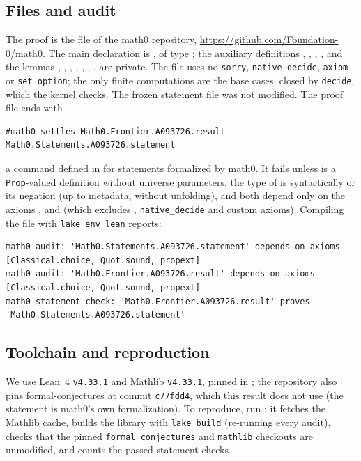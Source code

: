 \documentclass[11pt]{amsart}
\theoremstyle{plain}
\theoremstyle{definition}
\begin{document}
\subsection*{Files and audit}
The proof is the file  of the math0 repository, \url{https://github.com/Foundation-0/math0}. The main declaration is , of type ; the auxiliary definitions , , , ,  and the lemmas , , , , , , ,  are private. The file uses no \texttt{sorry}, \texttt{native\_decide}, \texttt{axiom} or \texttt{set\_option}; the only finite computations are the base cases, closed by \texttt{decide}, which the kernel checks. The frozen statement file was not modified. The proof file ends with
\begin{lstlisting}[basicstyle=\ttfamily\scriptsize]
#math0_settles Math0.Frontier.A093726.result Math0.Statements.A093726.statement
\end{lstlisting}
a command defined in  for statements formalized by math0. It fails unless  is a \texttt{Prop}-valued definition without universe parameters, the type of  is syntactically  or its negation (up to metadata, without unfolding), and both depend only on the axioms ,  and  (which excludes , \texttt{native\_decide} and custom axioms). Compiling the file with \texttt{lake env lean} reports:
\begin{lstlisting}[basicstyle=\ttfamily\scriptsize,belowskip=0pt]
math0 audit: 'Math0.Statements.A093726.statement' depends on axioms [Classical.choice, Quot.sound, propext]
math0 audit: 'Math0.Frontier.A093726.result' depends on axioms [Classical.choice, Quot.sound, propext]
math0 statement check: 'Math0.Frontier.A093726.result' proves 'Math0.Statements.A093726.statement'
\end{lstlisting}

\subsection*{Toolchain and reproduction}
We use Lean~4 \cite{Lean4} \texttt{v4.33.1} and Mathlib \cite{Mathlib} \texttt{v4.33.1}, pinned in ; the repository also pins formal-conjectures \cite{FC} at commit \texttt{c77fdd4}, which this result does not use (the statement is math0's own formalization). To reproduce, run : it fetches the Mathlib cache, builds the library with \texttt{lake build} (re-running every audit), checks that the pinned \texttt{formal\_conjectures} and \texttt{mathlib} checkouts are unmodified, and counts the passed statement checks.
\end{document}
